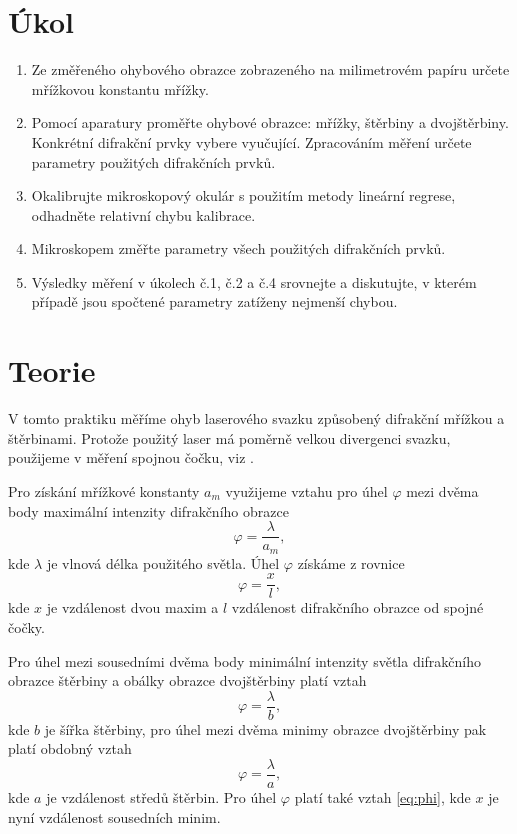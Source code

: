 \documentclass{protokol}
\begin{document}
  \section*{Úkol}

    \begin{enumerate}
      \item Ze změřeného ohybového obrazce zobrazeného na milimetrovém papíru určete mřížkovou konstantu mřížky.
      \item Pomocí aparatury proměřte ohybové obrazce: mřížky, štěrbiny a dvojštěrbiny. Konkrétní difrakční prvky vybere vyučující. Zpracováním měření určete parametry použitých difrakčních prvků.
      \item Okalibrujte mikroskopový okulár s použitím metody lineární regrese, odhadněte relativní chybu kalibrace.
      \item Mikroskopem změřte parametry všech použitých difrakčních prvků.
      \item Výsledky měření v úkolech č.1, č.2 a č.4 srovnejte a diskutujte, v kterém případě jsou spočtené parametry zatíženy nejmenší chybou. 
    \end{enumerate}

  \section*{Teorie}

    V tomto praktiku měříme ohyb laserového svazku způsobený difrakční mřížkou a štěrbinami. Protože použitý laser má poměrně velkou divergenci svazku, použijeme v měření spojnou čočku, viz \cite{mereni}. 

    Pro získání mřížkové konstanty $a_m$ využijeme vztahu pro úhel $\varphi$ mezi dvěma body maximální intenzity difrakčního obrazce
    \begin{equation} \label{eq:mrizkova_konstanta}
      \varphi = \frac{\lambda}{a_m},
    \end{equation} 
    kde $\lambda$ je vlnová délka použitého světla. Úhel $\varphi$ získáme z rovnice
    \begin{equation} \label{eq:phi}
      \varphi = \frac{x}{l},
    \end{equation}
    kde $x$ je vzdálenost dvou maxim a $l$ vzdálenost difrakčního obrazce od spojné čočky. 

    Pro úhel mezi sousedními dvěma body minimální intenzity světla difrakčního obrazce štěrbiny a obálky obrazce dvojštěrbiny platí vztah
    \begin{equation} \label{eq:sterbina}
      \varphi = \frac{\lambda}{b},
    \end{equation}
    kde $b$ je šířka štěrbiny,
    pro úhel mezi dvěma minimy obrazce dvojštěrbiny pak platí obdobný vztah
    \begin{equation} \label{eq:dvojsterbina}
      \varphi = \frac{\lambda}{a},
    \end{equation}
    kde $a$ je vzdálenost středů štěrbin. Pro úhel $\varphi$ platí také vztah \eqref{eq:phi}, kde $x$ je nyní vzdálenost sousedních minim.
\end{document}
